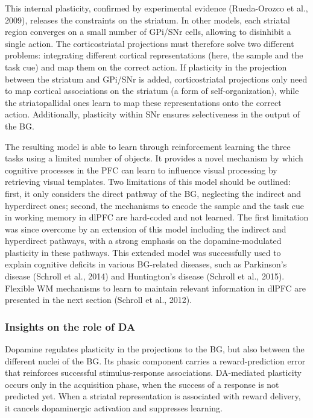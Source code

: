 \documentclass[
  11pt,
  a4paper,
]{scrbook}
\begin{document}
This internal plasticity, confirmed by experimental evidence
(Rueda-Orozco et al., 2009), releases the constraints on the striatum.
In other models, each striatal region converges on a small number of
GPi/SNr cells, allowing to disinhibit a single action. The
corticostriatal projections must therefore solve two different problems:
integrating different cortical representations (here, the sample and the
task cue) and map them on the correct action. If plasticity in the
projection between the striatum and GPi/SNr is added, corticostriatal
projections only need to map cortical associations on the striatum (a
form of self-organization), while the striatopallidal ones learn to map
these representations onto the correct action. Additionally, plasticity
within SNr ensures selectiveness in the output of the BG.

The resulting model is able to learn through reinforcement learning the
three tasks using a limited number of objects. It provides a novel
mechanism by which cognitive processes in the PFC can learn to influence
visual processing by retrieving visual templates. Two limitations of
this model should be outlined: first, it only considers the direct
pathway of the BG, neglecting the indirect and hyperdirect ones; second,
the mechanisms to encode the sample and the task cue in working memory
in dlPFC are hard-coded and not learned. The first limitation was since
overcome by an extension of this model including the indirect and
hyperdirect pathways, with a strong emphasis on the dopamine-modulated
plasticity in these pathways. This extended model was successfully used
to explain cognitive deficits in various BG-related diseases, such as
Parkinson's disease (Schroll et al., 2014) and Huntington's disease
(Schroll et al., 2015). Flexible WM mechanisms to learn to maintain
relevant information in dlPFC are presented in the next section (Schroll
et al., 2012).

\subsubsection*{Insights on the role of
DA}\label{insights-on-the-role-of-da-1}

Dopamine regulates plasticity in the projections to the BG, but also
between the different nuclei of the BG. Its phasic component carries a
reward-prediction error that reinforces successful stimulus-response
associations. DA-mediated plasticity occurs only in the acquisition
phase, when the success of a response is not predicted yet. When a
striatal representation is associated with reward delivery, it cancels
dopaminergic activation and suppresses learning.
\end{document}
